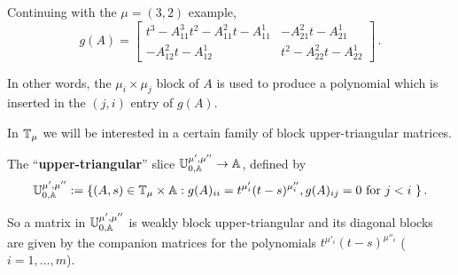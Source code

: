 \documentclass{article} %
\begin{document}
Continuing with the $\mu=(3,2)$ example, 
\[
        g(A) = 
        \left[\begin{array}{rr}
            t^{3} - A_{11}^3 t^2 - A_{11}^2 t - A_{11}^1 & -A_{21}^2t - A_{21}^1  \\
            -A_{12}^2 t - A_{12}^1 & t^{2} - A_{22}^2 t - A_{22}^1
        \end{array}
        \right]\,. 
\]
% 
% 

In other words, the $ \mu_i\times\mu_j$ block of $ A $ is used to produce a polynomial which is inserted in the $(j,i)$ entry of $ g(A)$. 

In $\mathbb T_\mu$ we will be interested in a certain family of block upper-triangular matrices.
\begin{definition} The ``\textbf{upper-triangular}'' \mvy slice $\mathbb U^{\mu', \mu''}_{0,\mathbb A}\rightarrow \mathbb A $, defined by
$$
\mathbb U^{\mu', \mu''}_{0,\mathbb A} := \{ (A,s) \in \mathbb T_\mu \times \mathbb A : g(A)_{ii} = t^{\mu'_{i}} (t-s)^{\mu''_{i}}, g(A)_{ij} = 0 \text{ for $ j < i $ }\}\,. 
$$
\end{definition}
So a matrix in $\mathbb U^{\mu', \mu''}_{0,\mathbb A}$ is weakly block upper-triangular and its diagonal blocks are given by the companion matrices for the polynomials $t^{\mu'_{i}} (t-s)^{\mu''_{i}}$ ($i=1,\dots,m$).
\end{document}

